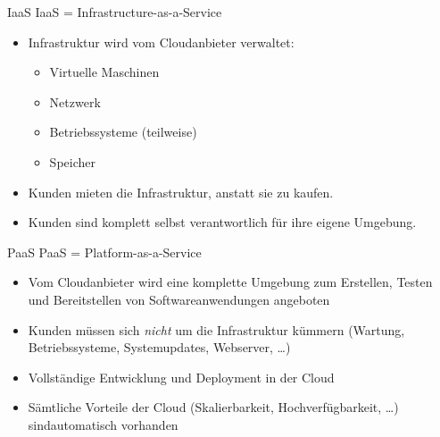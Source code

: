 \begin{flashcard}[Definition]{IaaS}
    IaaS = Infrastructure-as-a-Service

    \begin{itemize}
        \item Infrastruktur wird vom Cloudanbieter verwaltet:
        \begin{itemize}
            \item Virtuelle Maschinen
            \item Netzwerk
            \item Betriebssysteme (teilweise)
            \item Speicher
        \end{itemize}
        \item Kunden mieten die Infrastruktur, anstatt sie zu kaufen.
        \item Kunden sind komplett selbst verantwortlich für ihre eigene Umgebung.
    \end{itemize}
\end{flashcard}

\begin{flashcard}[Definition]{PaaS}
    PaaS = Platform-as-a-Service

    \begin{itemize}
        \item Vom Cloudanbieter wird eine komplette Umgebung zum Erstellen, Testen und Bereitstellen von Softwareanwendungen angeboten
        \item Kunden müssen sich \emph{nicht} um die Infrastruktur kümmern\newline
        (Wartung, Betriebssysteme, Systemupdates, Webserver, \ldots)
        \item Vollständige Entwicklung und Deployment in der Cloud
        \item Sämtliche Vorteile der Cloud (Skalierbarkeit, Hochverfügbarkeit, \ldots) sind\newline automatisch vorhanden
    \end{itemize}
\end{flashcard}

